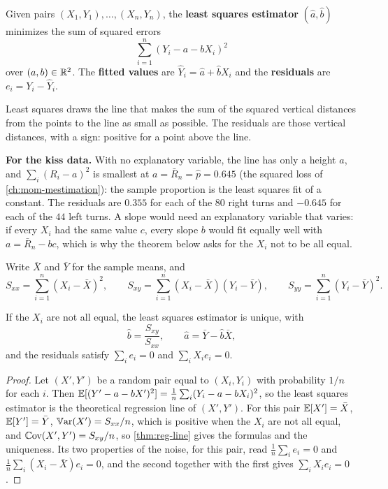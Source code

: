 \begin{definition}
\label{def:lse}
Given pairs $(X_1, Y_1), \ldots, (X_n, Y_n)$, the \textbf{least squares estimator} $(\hat{a}, \hat{b})$ minimizes the sum of squared errors
\[
\sum_{i=1}^n (Y_i - a - bX_i)^2
\]
over $(a, b) \in \mathbb{R}^2$.
The \textbf{fitted values} are $\hat{Y}_i = \hat{a} + \hat{b}X_i$ and the \textbf{residuals} are $e_i = Y_i - \hat{Y}_i$.
\end{definition}

\begin{inwords}
Least squares draws the line that makes the sum of the squared vertical distances from the points to the line as small as possible. The residuals are those vertical distances, with a sign: positive for a point above the line.

\textbf{For the kiss data.} With no explanatory variable, the line has only a height $a$, and $\sum_i (R_i - a)^2$ is smallest at $a = \bar{R}_n = \hat{p} = 0.645$ (the squared loss of \cref{ch:mom-mestimation}): the sample proportion is the least squares fit of a constant. The residuals are $0.355$ for each of the $80$ right turns and $-0.645$ for each of the $44$ left turns. A slope would need an explanatory variable that varies: if every $X_i$ had the same value $c$, every slope $b$ would fit equally well with $a = \bar{R}_n - bc$, which is why the theorem below asks for the $X_i$ not to be all equal.
\end{inwords}

Write $\bar{X}$ and $\bar{Y}$ for the sample means, and
\[
S_{xx} = \sum_{i=1}^n (X_i - \bar{X})^2, \qquad S_{xy} = \sum_{i=1}^n (X_i - \bar{X})(Y_i - \bar{Y}), \qquad S_{yy} = \sum_{i=1}^n (Y_i - \bar{Y})^2.
\]

\begin{theorem}
\label{thm:lse}
If the $X_i$ are not all equal, the least squares estimator is unique, with
\[
\hat{b} = \frac{S_{xy}}{S_{xx}}, \qquad \hat{a} = \bar{Y} - \hat{b}\bar{X},
\]
and the residuals satisfy $\sum_i e_i = 0$ and $\sum_i X_i e_i = 0$.
\end{theorem}
\begin{proof}
Let $(X', Y')$ be a random pair equal to $(X_i, Y_i)$ with probability $1/n$ for each $i$.
Then $\operatorname*{\mathbb{E}}[(Y' - a - bX')^2] = \frac1n\sum_i (Y_i - a - bX_i)^2$, so the least squares estimator is the theoretical regression line of $(X', Y')$.
For this pair $\operatorname*{\mathbb{E}}[X'] = \bar{X}$, $\operatorname*{\mathbb{E}}[Y'] = \bar{Y}$, $\operatorname*{\mathbb{V}\text{ar}}(X') = S_{xx}/n$, which is positive when the $X_i$ are not all equal, and $\operatorname*{\mathbb{C}\text{ov}}(X', Y') = S_{xy}/n$, so \cref{thm:reg-line} gives the formulas and the uniqueness.
Its two properties of the noise, for this pair, read $\frac1n\sum_i e_i = 0$ and $\frac1n\sum_i (X_i - \bar{X})e_i = 0$, and the second together with the first gives $\sum_i X_i e_i = 0$.
\end{proof}

